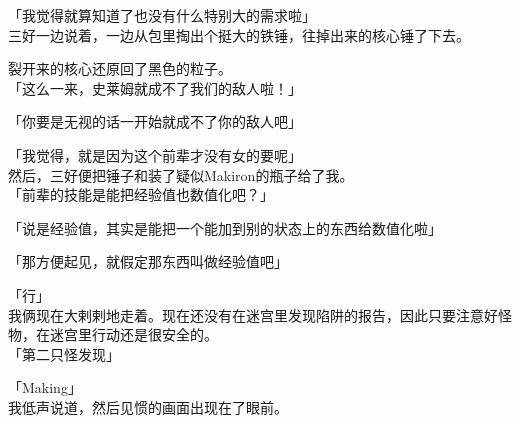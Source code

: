 「我觉得就算知道了也没有什么特别大的需求啦」\\

三好一边说着，一边从包里掏出个挺大的铁锤，往掉出来的核心锤了下去。

裂开来的核心还原回了黑色的粒子。\\

「这么一来，史莱姆就成不了我们的敌人啦！」

「你要是无视的话一开始就成不了你的敌人吧」

「我觉得，就是因为这个前辈才没有女的要呢」\\

然后，三好便把锤子和装了疑似Makiron的瓶子给了我。\\

「前辈的技能是能把经验值也数值化吧？」

「说是经验值，其实是能把一个能加到别的状态上的东西给数值化啦」

「那方便起见，就假定那东西叫做经验值吧」

「行」\\

我俩现在大剌剌地走着。现在还没有在迷宫里发现陷阱的报告，因此只要注意好怪物，在迷宫里行动还是很安全的。\\

「第二只怪发现」

「Making」\\

我低声说道，然后见惯的画面出现在了眼前。\\

